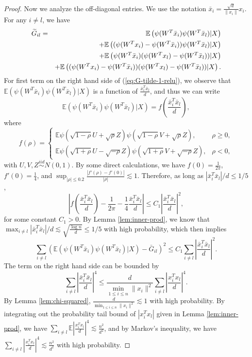 \begin{proof}
Now we analyze the off-diagonal entries. We use the notation $\bar{x}_i=\frac{\sqrt{d}}{\|x_i\|}x_i$. For any $i\neq l$, we have
\begin{eqnarray}
\label{eq:G-tilde-1-relu} \wt{G}_{il} &=& \mathbb{E}\left(\psi(W^T\bar{x}_i)\psi(W^T\bar{x}_l)|X\right) \\
\label{eq:G-tilde-2-relu} && + \mathbb{E}\left((\psi(W^Tx_i)-\psi(W^T\bar{x}_i))\psi(W^T\bar{x}_l)|X\right) \\
\label{eq:G-tilde-3-relu} && + \mathbb{E}\left(\psi(W^T\bar{x}_i)(\psi(W^Tx_l)-\psi(W^T\bar{x}_l))|X\right) \\
\label{eq:G-tilde-4-relu} && + \mathbb{E}\left((\psi(W^Tx_i)-\psi(W^T\bar{x}_i))(\psi(W^Tx_l)-\psi(W^T\bar{x}_l))|X\right).
\end{eqnarray}
For first term on the right hand side of (\ref{eq:G-tilde-1-relu}), we observe that $\mathbb{E}\left(\psi(W^T\bar{x}_i)\psi(W^T\bar{x}_l)|X\right)$ is a function of $\frac{\bar{x}_i^T\bar{x}_l}{d}$, and thus we can write
$$\mathbb{E}\left(\psi(W^T\bar{x}_i)\psi(W^T\bar{x}_l)|X\right)=f\left(\frac{\bar{x}_i^T\bar{x}_l}{d}\right),$$
where
$$f(\rho) = \begin{cases}
\mathbb{E}\psi(\sqrt{1-\rho}U+\sqrt{\rho}Z)\psi(\sqrt{1-\rho}V+\sqrt{\rho}Z), & \rho \geq 0, \\
\mathbb{E}\psi(\sqrt{1+\rho}U-\sqrt{-\rho}Z)\psi(\sqrt{1+\rho}V+\sqrt{-\rho}Z), & \rho < 0,
\end{cases}$$
with $U,V,Z\stackrel{iid}{\sim} N(0,1)$. By some direct calculations, we have $f(0)=\frac{1}{2\pi}$, $f'(0)=\frac{1}{4}$, and $\sup_{|\rho|\leq 0.2}\frac{|f'(\rho)-f'(0)|}{|\rho|}\lesssim 1$. Therefore, as long as $|\bar{x}_i^T\bar{x}_l|/d\leq 1/5$,
$$\left|f\left(\frac{\bar{x}_i^T\bar{x}_l}{d}\right)-\frac{1}{2\pi}-\frac{1}{4}\frac{\bar{x}_i^T\bar{x}_l}{d}\right|\leq C_1\left|\frac{\bar{x}_i^T\bar{x}_l}{d}\right|^2,$$
for some constant $C_1>0$. By Lemma \ref{lem:inner-prod}, we know that $\max_{i\neq l}|\bar{x}_i^T\bar{x}_l|/d\lesssim \sqrt{\frac{\log n}{d}}\leq 1/5$ with high probability, which then implies
$$\sum_{i\neq l}\left(\mathbb{E}\left(\psi(W^T\bar{x}_i)\psi(W^T\bar{x}_l)|X\right)-\bar{G}_{il}\right)^2 \leq C_1\sum_{i\neq l}\left|\frac{\bar{x}_i^T\bar{x}_l}{d}\right|^2.$$
The term on the right hand side can be bounded by
$$\sum_{i\neq l}\left|\frac{\bar{x}_i^T\bar{x}_l}{d}\right|^4\leq \frac{d}{\min_{1\leq i\leq n}\|x_i\|^2}\sum_{i\neq l}\left|\frac{x_i^Tx_l}{d}\right|^4.$$
By Lemma \ref{lem:chi-squared}, $\frac{d}{\min_{1\leq i\leq n}\|x_i\|^2}\lesssim 1$ with high probability. By integrating out the probability tail bound of $|x_i^Tx_l|$ given in Lemma \ref{lem:inner-prod}, we have $\sum_{i\neq l}\mathbb{E}\left|\frac{x_i^Tx_l}{d}\right|^4\lesssim \frac{n^2}{d^2}$, and by Markov's inequality, we have $\sum_{i\neq l}\left|\frac{x_i^Tx_l}{d}\right|^4\lesssim \frac{n^2}{d^2}$ with high probability.


\end{proof}
